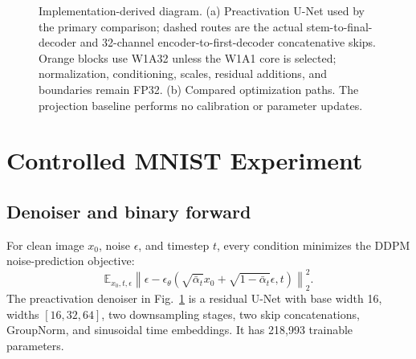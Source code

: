 \documentclass[conference]{IEEEtran}
\begin{document}
\begin{figure}[t]
{
}
\caption{Implementation-derived diagram. (a) Preactivation U-Net used by the
primary comparison; dashed routes are the actual stem-to-final-decoder and
32-channel encoder-to-first-decoder concatenative skips. Orange blocks use
W1A32 unless the W1A1 core is selected; normalization, conditioning, scales,
residual additions, and boundaries remain FP32. (b) Compared optimization
paths. The projection baseline performs no calibration or parameter updates.}
\label{fig:architecture}
\end{figure}

\section{Controlled MNIST Experiment}

\subsection{Denoiser and binary forward}

For clean image $x_0$, noise $\epsilon$, and timestep $t$, every condition
minimizes the DDPM noise-prediction objective\cite{ho2020ddpm}:
\begin{equation}
\mathbb E_{x_0,t,\epsilon}\left\|\epsilon-\epsilon_\theta
\left(\sqrt{\bar\alpha_t}x_0+\sqrt{1-\bar\alpha_t}\epsilon,t\right)\right\|_2^2.
\end{equation}
The preactivation denoiser in Fig.~\ref{fig:architecture} is a residual U-Net
\cite{ronneberger2015unet} with base width 16, widths $[16,32,64]$, two
downsampling stages, two skip concatenations, GroupNorm, and sinusoidal time
embeddings\cite{wu2018groupnorm,vaswani2017attention}. It has 218,993 trainable
parameters.
\end{document}
